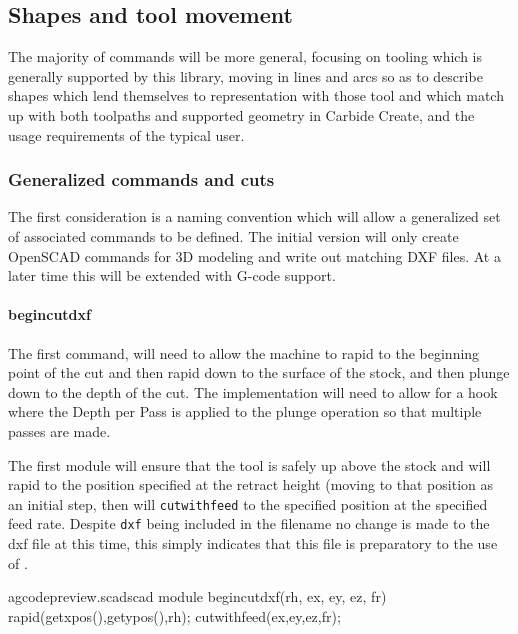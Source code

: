 \documentclass{ltxdoc}
\begin{document}
\subsection{Shapes and tool movement}
 
The majority of commands will be more general, focusing on tooling which is generally
supported by this library, moving in lines and arcs so as to describe shapes which
lend themselves to representation with those tool and which match up with both
toolpaths and supported geometry in Carbide Create, and the usage requirements of
the typical user.

\subsubsection{Generalized commands and cuts}

The first consideration is a naming convention which will allow a generalized set of associated
commands to be defined. The initial version will only create OpenSCAD commands for 3D modeling
and write out matching DXF files. At a later time this will be extended with G-code support.
 
\paragraph{begincutdxf}
 
The first command,  will need to allow the machine to rapid to 
the beginning point of the cut and then rapid down to the surface of the stock, and then 
plunge down to the depth of the cut. The implementation will need to allow for a hook where 
the Depth per Pass is applied to the plunge operation so that multiple passes are made.

The first module will ensure that the tool is safely up above
the stock and will rapid to the position specified at the retract height (moving to that 
position as an initial step, then will \texttt{cutwithfeed} to the specified position
at the specified feed rate. Despite \texttt{dxf} being included in the filename no change
is made to the dxf file at this time, this simply indicates that this file is preparatory to
the use of .

\lstset{firstnumber=\thegcpscad}
\begin{writecode}{a}{gcodepreview.scad}{scad}
module begincutdxf(rh, ex, ey, ez, fr) {
  rapid(getxpos(),getypos(),rh);
  cutwithfeed(ex,ey,ez,fr);
}

\end{writecode}
\addtocounter{gcpscad}{5}
 
\end{document}
